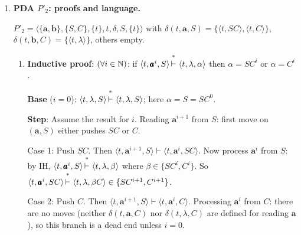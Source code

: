 \begin{enumerate}[{10.}1. ]
Let $P'_1 = \langle\{\pmb{a},\pmb{b}\},\{Z,A\},\{t\},t,\delta,Z,\{t\}\rangle$ where:
\begin{align*}
\delta(t,\pmb{a},Z) &= \langle t, AZ\rangle \quad\text{(push $A$ on reading first \pmb{a})} \\
\delta(t,\pmb{a},A) &= \langle t, AA\rangle \quad\text{(push another $A$ for each subsequent \pmb{a})} \\
\delta(t,\pmb{b},A) &= \langle t, \lambda\rangle \quad\text{(pop $A$ on reading \pmb{b})}
\end{align*}
The machine pushes one $A$ for each $\pmb{a}$ read, then pops one $A$ for each $\pmb{b}$ read. It accepts when the input is exhausted in state $t$: this occurs precisely when the $\pmb{a}$s and $\pmb{b}$s are balanced (stack returned to $Z$) or when the input is empty. Note: $\delta(t,\pmb{b},Z)$ is undefined, so a string with more $\pmb{b}$s than $\pmb{a}$s causes the machine to get stuck (reject). Hence $\Lambda(P'_1) = \{\pmb{a}^n\pmb{b}^n \mid n\geq 0\}$.

\item \textbf{PDA $P'_2$: proofs and language.}

$P'_2 = \langle\{\pmb{a},\pmb{b}\},\{S,C\},\{t\},t,\delta,S,\{t\}\rangle$ with $\delta(t,\pmb{a},S) = \{\langle t,SC\rangle,\langle t,C\rangle\}$, $\delta(t,\pmb{b},C) = \{\langle t,\lambda\rangle\}$, others empty.

\begin{enumerate}
\item \textbf{Inductive proof}: $(\forall i\in\mathbb{N})$: if $\langle t,\pmb{a}^i,S\rangle\Dvdash\langle t,\lambda,\alpha\rangle$ then $\alpha = SC^i$ or $\alpha = C^i$.

\textbf{Base} ($i=0$): $\langle t,\lambda,S\rangle\Dvdash\langle t,\lambda,S\rangle$; here $\alpha=S=SC^0$. \checkmark

\textbf{Step}: Assume the result for $i$. Reading $\pmb{a}^{i+1}$ from $S$: first move on $(\pmb{a},S)$ either pushes $SC$ or $C$.

Case 1: Push $SC$. Then $\langle t,\pmb{a}^{i+1},S\rangle\vdash\langle t,\pmb{a}^i,SC\rangle$. Now process $\pmb{a}^i$ from $S$: by IH, $\langle t,\pmb{a}^i,S\rangle\Dvdash\langle t,\lambda,\beta\rangle$ where $\beta\in\{SC^i,C^i\}$. So $\langle t,\pmb{a}^i,SC\rangle\Dvdash\langle t,\lambda,\beta C\rangle\in\{SC^{i+1},C^{i+1}\}$.

Case 2: Push $C$. Then $\langle t,\pmb{a}^{i+1},S\rangle\vdash\langle t,\pmb{a}^i,C\rangle$. Processing $\pmb{a}^i$ from $C$: there are no moves (neither $\delta(t,\pmb{a},C)$ nor $\delta(t,\lambda,C)$ are defined for reading $\pmb{a}$), so this branch is a dead end unless $i=0$.


\end{enumerate}
\end{enumerate}
